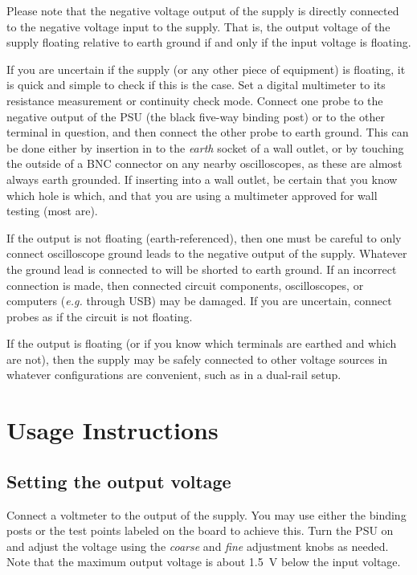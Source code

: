\documentclass[letterpaper,twocolumn,11pt]{article}
\begin{document}
Please note that the negative voltage output of the supply is directly connected
to the negative voltage input to the supply. That is, the output voltage of the
supply floating relative to earth ground if and only if the input voltage is
floating.

If you are uncertain if the supply (or any other piece of equipment) is
floating, it is quick and simple to check if this is the case. Set a digital
multimeter to its resistance measurement or continuity check mode. Connect one
probe to the negative output of the PSU (the black five-way binding post) or to
the other terminal in question, and then connect the other probe to earth
ground. This can be done either by insertion in to the \emph{earth} socket of a
wall outlet, or by touching the outside of a BNC connector on any nearby
oscilloscopes, as these are almost always earth grounded. If inserting into a
wall outlet, be certain that you know which hole is which, and that you are
using a multimeter approved for wall testing (most are).

If the output is not floating (earth-referenced), then one must be careful to
only connect oscilloscope ground leads to the negative output of the supply.
Whatever the ground lead is connected to will be shorted to earth ground. If an
incorrect connection is made, then connected circuit components, oscilloscopes,
or computers (\textit{e.g.} through USB) may be damaged. If you are uncertain,
connect probes as if the circuit is not floating.

If the output is floating (or if you know which terminals are earthed and which
are not), then the supply may be safely connected to other voltage sources in
whatever configurations are convenient, such as in a dual-rail setup.

\section{Usage Instructions}

\subsection{Setting the output voltage}

Connect a voltmeter to the output of the supply. You may use either the binding
posts or the test points labeled on the board to achieve this. Turn the PSU on
and adjust the voltage using the \emph{coarse} and \emph{fine} adjustment knobs
as needed. Note that the maximum output voltage is about \SI{1.5}{\V} below the
input voltage.
\end{document}
